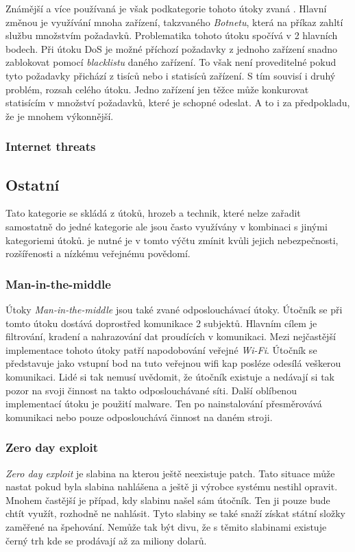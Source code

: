 Známější a více používaná je však podkategorie tohoto útoky zvaná .
Hlavní změnou je využívání mnoha zařízení, takzvaného \textit{Botnetu}, která na příkaz zahltí službu množstvím požadavků.
Problematika tohoto útoku spočívá v 2 hlavních bodech.
Při útoku \ac{DoS} je možné příchozí požadavky z jednoho zařízení snadno zablokovat pomocí \textit{blacklistu} daného zařízení.
To však není proveditelné pokud tyto požadavky přichází z tisíců nebo i statisíců zařízení.
S tím souvisí i druhý problém, rozsah celého útoku.
Jedno zařízení jen těžce může konkurovat statisícím v množství požadavků, které je schopné odeslat.
A to i za předpokladu, že je mnohem výkonnější.

\subsubsection{Internet threats}

\subsection{Ostatní}
Tato kategorie se skládá z útoků, hrozeb a technik, které nelze zařadit samostatně do jedné kategorie ale jsou často využívány v kombinaci s jinými kategoriemi útoků.
je nutné je v tomto výčtu zmínit kvůli jejich nebezpečnosti, rozšířenosti a nízkému veřejnému povědomí.

\subsubsection{Man-in-the-middle}
Útoky \textit{Man-in-the-middle} jsou také zvané odposlouchávací útoky.
Útočník se při tomto útoku dostává doprostřed komunikace 2 subjektů.
Hlavním cílem je filtrování, kradení a nahrazování dat proudících v komunikaci.
Mezi nejčastější implementace tohoto útoky patří napodobování veřejné \textit{Wi-Fi}.
Útočník se představuje jako vstupní bod na tuto veřejnou wifi kap posléze odesílá veškerou komunikaci.
Lidé si tak nemusí uvědomit, že útočník existuje a nedávají si tak pozor na svoji činnost na takto odposlouchávané síti.
Další oblíbenou implementací útoku je použití malware.
Ten po nainstalování přesměrovává komunikaci nebo pouze odposlouchává činnost na daném stroji.\cite{cisco_most_common_attack}

\subsubsection{Zero day exploit}
\textit{Zero day exploit} je slabina na kterou ještě neexistuje patch.
Tato situace může nastat pokud byla slabina nahlášena a ještě ji výrobce systému nestihl opravit.
Mnohem častější je případ, kdy slabinu našel sám útočník.
Ten ji pouze bude chtít využít, rozhodně ne nahlásit.
Tyto slabiny se také snaží získat státní složky zaměřené na špehování.
Nemůže tak být divu, že s těmito slabinami existuje černý trh\cite{world_end_2021} kde se prodávají až za miliony dolarů.


